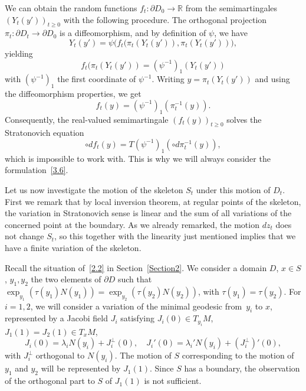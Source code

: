 \documentclass[10pt]{amsart}
\theoremstyle{plain}
\theoremstyle{definition}
\newcommand{\RR}{{\mathbb R}}
\let\l\lambda
\begin{document}
We can obtain the random functions $f_t:\partial D_0\to \RR$ from the semimartingales $(Y_t(y'))_{t\ge 0}$ with the following procedure. The orthogonal projection $\pi_t: \partial D_t\to \partial D_0$ is a diffeomorphism, and by definition of $\psi$, we have
\begin{equation}
Y_t(y')=\psi \bigl(f_t(\pi_t(Y_t(y')),\pi_t(Y_t(y'))\bigr),
\end{equation}
yielding
\begin{equation}
f_t(\pi_t(Y_t(y'))=\left(\psi^{-1}\right)_1(Y_t(y'))
\end{equation}
with $\left(\psi^{-1}\right)_1$ the first coordinate of $\psi^{-1}$.
Writing $y=\pi_t(Y_t(y'))$ and using the diffeomorphism properties, we get
\begin{equation}
f_t(y)=\left(\psi^{-1}\right)_1(\pi_t^{-1}(y)).
\end{equation}
Consequently, the real-valued semimartingale $(f_t(y))_{t\ge 0}$ solves the Stratonovich equation
\begin{equation}
\circ df_t(y)=T\left(\psi^{-1}\right)_1(\circ d\pi_t^{-1}(y)),
\end{equation}
which is impossible to work with. This is why we will always consider the formulation~\eqref{3.6}.

Let us now investigate the motion of the skeleton $S_t$ under this motion of $D_t$. First we remark that by local inversion theorem, at regular points of the skeleton, the variation {in Stratonovich sense} is linear and the sum of all variations
of the concerned point at the boundary.
As we already remarked, the motion $dz_t$ does not change $S_t${, so this together with the linearity just mentioned implies that we have a finite variation of the skeleton}.

Recall the situation of~\eqref{2.2} in Section~\ref{Section2}. We consider a domain $D$, $x\in S$, $y_1,y_2$ the two elements of $\partial D$ such that $\exp_{y_1}\left(\tau(y_1)N(y_1)\right)=\exp_{y_2}\left(\tau(y_2)N(y_2)\right)$, with $\tau(y_1)=\tau(y_2)$.
For $i=1,2$, we will consider a variation of the minimal geodesic from~$y_i$ to $x$, represented by a Jacobi field $J_i$ satisfying $J_i(0)\in T_{y_i}M$, $J_1(1)=J_2(1)\in T_xM$,
\begin{equation}
J_i(0)=\l_i N(y_i)+J_i^\perp(0), \quad J_i'(0)=\l_i'N(y_i)+(J_i^\perp)'(0),
\end{equation}
with $J_i^\perp$ orthogonal to $N(y_i)$. The motion of $S$ corresponding to the motion of $y_1$ and $y_2$ will be represented by $J_1(1)$. Since $S$ has a boundary, the observation of the orthogonal part {to $S$ of $J_1(1)$} is not sufficient.
\end{document}

